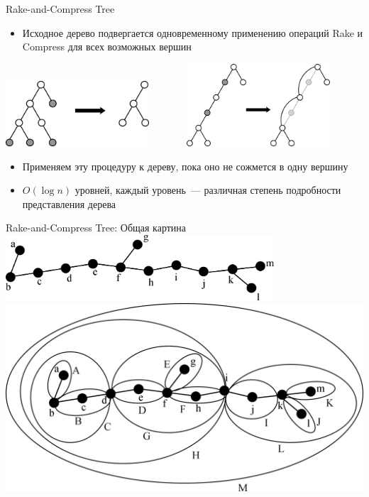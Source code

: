 \documentclass[hyperref=unicode,graphics=pdflatex,13pt]{beamer}
\begin{document}
\begin{frame}[shrink]{Rake-and-Compress Tree}
\begin{itemize}
    \item Исходное дерево подвергается одновременному применению операций Rake и Compress для всех 
          возможных вершин
\end{itemize}
\centering
\includegraphics[width=0.4\textwidth]{picture/rake.png}~~~~~~~
\includegraphics[width=0.4\textwidth]{picture/compress.png}
\begin{itemize}
    \item Применяем эту процедуру к дереву, пока оно не сожмется в одну вершину
    \item $O(\log n)$ уровней, каждый уровень~--- различная степень подробности представления 
          дерева
\end{itemize}
\end{frame}

\begin{frame}[shrink]{Rake-and-Compress Tree: Общая картина}
\centering
\includegraphics[width=0.75\textwidth]{picture/rc_tree_1_primitive_tree.png}\\
\includegraphics[width=1.0\textwidth]{picture/rc_tree_2_completed_clustering.png}
\end{frame}
\end{document}
